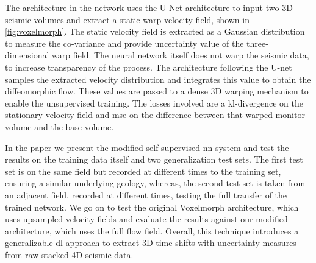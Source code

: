 The architecture in the network uses the U-Net architecture to input two 3D seismic volumes and extract a static warp velocity field, shown in \cref{fig:voxelmorph}. The static velocity field is extracted as a Gaussian distribution to measure the co-variance and provide uncertainty value of the three-dimensional warp field. The neural network itself does not warp the seismic data, to increase transparency of the process. The architecture following the U-net samples the extracted velocity distribution and integrates this value to obtain the diffeomorphic flow. These values are passed to a dense 3D warping mechanism to enable the unsupervised training. The losses involved are a \acf{kl}-divergence on the stationary velocity field and \ac{mse} on the difference between that warped monitor volume and the base volume.

In the paper we present the modified self-supervised \acl{nn} system and test the results on the training data itself and two generalization test sets. The first test set is on the same field but recorded at different times to the training set, ensuring a similar underlying geology, whereas, the second test set is taken from an adjacent field, recorded at different times, testing the full transfer of the trained network. We go on to test the original Voxelmorph architecture, which uses upsampled velocity fields and evaluate the results against our modified architecture, which uses the full flow field. Overall, this technique introduces a generalizable \acl{dl} approach to extract 3D time-shifts with uncertainty measures from raw stacked 4D seismic data.